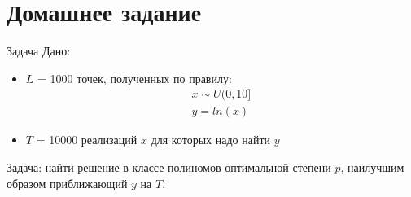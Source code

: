 \documentclass[14pt, fleqn, xcolor={dvipsnames, table}]{beamer}
\begin{document}
\section{Домашнее задание}
\begin{frame}{Задача}
Дано:
\begin{itemize}
  \item $L$ = 1000 точек, полученных по правилу:
$$\begin{array}{l}
x \sim U (0,10] \\
y = ln(x)
\end{array}$$
  \item $T$ = 10000 реализаций $x$ для которых надо найти $y$
\end{itemize}
Задача: найти решение в классе полиномов оптимальной степени $p$, наилучшим образом приближающий $y$ на $T$.

\end{frame}
\end{document}
